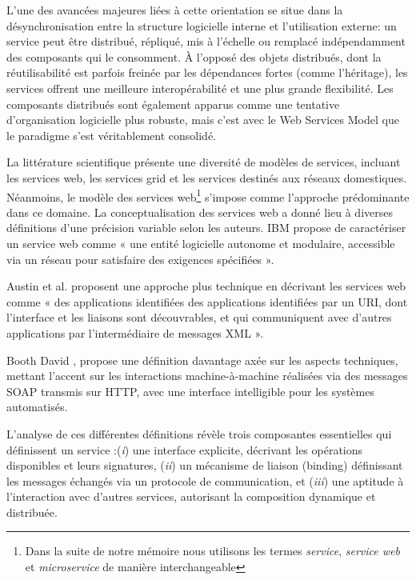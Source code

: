 L’une des avancées majeures liées à cette orientation se situe dans la désynchronisation entre la structure logicielle interne et l’utilisation externe: un service peut être distribué, répliqué, mis à l’échelle ou remplacé indépendamment des composants qui le consomment. À l’opposé des objets distribués, dont la réutilisabilité est parfois freinée par les dépendances fortes (comme l’héritage), les services offrent une meilleure interopérabilité et une plus grande flexibilité. Les composants distribués sont également apparus comme une tentative d’organisation logicielle plus robuste, mais c’est avec le Web Services Model que le paradigme s’est véritablement consolidé.

La littérature scientifique présente une diversité de modèles de services, incluant les services web, les services grid et les services destinés aux réseaux domestiques. Néanmoins, le modèle des services web\footnote{Dans la suite de notre mémoire nous utilisons les termes \textit{service}, \textit{service web} et \textit{microservice} de manière interchangeable} s'impose comme l'approche prédominante dans ce domaine. La conceptualisation des services web a donné lieu à diverses définitions d'une précision variable selon les auteurs. IBM  \cite{kreger2001web} propose de caractériser un service web comme « une entité logicielle autonome et modulaire, accessible via un réseau pour satisfaire des exigences spécifiées ».

Austin et al. \cite{austin2004web} proposent une approche plus technique en décrivant les services web comme « des applications identifiées des applications identifiées par un URI, dont l'interface et les liaisons sont découvrables, et qui communiquent avec d'autres applications par l'intermédiaire de messages XML ».

Booth David \cite{booth2004web}, propose une définition davantage axée sur les aspects techniques, mettant l'accent sur les interactions machine-à-machine réalisées via des messages SOAP transmis sur HTTP, avec une interface intelligible pour les systèmes automatisés.

L'analyse de ces différentes définitions révèle trois composantes essentielles qui définissent un service :(\textit{i}) une interface explicite, décrivant les opérations disponibles et leurs signatures, (\textit{ii}) un mécanisme de liaison (binding) définissant les messages échangés via un protocole de communication, et (\textit{iii}) une aptitude à l'interaction avec d'autres services, autorisant la composition dynamique et distribuée.

